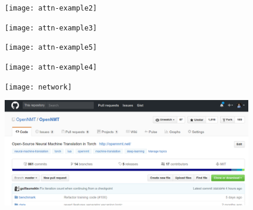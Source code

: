 \documentclass{beamer}
\begin{document}
\begin{frame}
  \begin{center}
  \end{center}
\center
\texttt{[image: attn-example2]}
\end{frame}


\begin{frame}
  \begin{center}
  \end{center}
\center
\texttt{[image: attn-example3]}
\end{frame}

\begin{frame}
  \begin{center}
  \end{center}
\center
\texttt{[image: attn-example5]}
\end{frame}

\begin{frame}
  \begin{center}
  \end{center}
\center
\texttt{[image: attn-example4]}
\end{frame}

\begin{frame}
  \begin{center}
    \texttt{[image: network]}
  \end{center}
\end{frame}

\begin{frame}
  \begin{center}
  \end{center}
\center
\includegraphics[width=11cm]{opennmt}
\end{frame}
\end{document}
